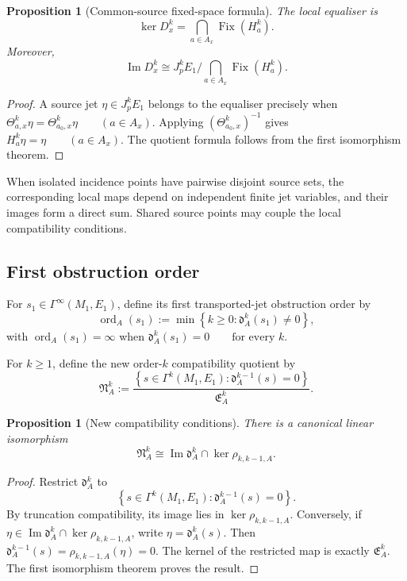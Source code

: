 \documentclass[11pt]{article}
\theoremstyle{plain}
\newtheorem{proposition}[theorem]{Proposition}
\theoremstyle{definition}
\begin{document}
\begin{proposition}[Common-source fixed-space formula]
\label{prop:common-source-fixed-space}
The local equaliser is
\[
  \ker D_x^k
  =
  \bigcap_{a\in A_x}
  \operatorname{Fix}(H_a^k).
\]
Moreover,
\[
  \operatorname{Im}D_x^k
  \cong
  J_p^kE_1
  \bigg/
  \bigcap_{a\in A_x}
  \operatorname{Fix}(H_a^k).
\]
\end{proposition}

\begin{proof}
A source jet \(\eta\in J_p^kE_1\) belongs to the equaliser precisely
when
\(\Theta_{a,x}^k\eta = \Theta_{a_0,x}^k\eta \qquad (a\in A_x)\).
Applying \(\left( \Theta_{a_0,x}^k \right)^{-1}\) gives
\(H_a^k\eta=\eta \qquad (a\in A_x)\).
The quotient formula follows from the first isomorphism theorem.
\end{proof}

When isolated incidence points have pairwise disjoint source sets, the
corresponding local maps depend on independent finite jet variables,
and their images form a direct sum. Shared source points may couple the
local compatibility conditions.

\subsection{First obstruction order}
\label{subsec:first-obstruction-order}

For
\(s_1\in\Gamma^\infty(M_1,E_1)\),
define its first transported-jet obstruction order by
\[
  \operatorname{ord}_A(s_1)
  :=
  \min
  \left\{
    k\geq0:
    \mathfrak d_A^k(s_1)\neq0
  \right\},
\]
with \(\operatorname{ord}_A(s_1)=\infty\) when
\(\mathfrak d_A^k(s_1)=0 \qquad \text{for every }k\).

For \(k\geq1\), define the new order-\(k\) compatibility quotient by
\[
  \mathfrak N_A^k
  :=
  \frac{
    \left\{
      s\in\Gamma^k(M_1,E_1):
      \mathfrak d_A^{k-1}(s)=0
    \right\}
  }{
    \mathfrak E_A^k
  }.
\]

\begin{proposition}[New compatibility conditions]
\label{prop:new-order-defect}
There is a canonical linear isomorphism
\[
  \mathfrak N_A^k
  \cong
  \operatorname{Im}\mathfrak d_A^k
  \cap
  \ker\rho_{k,k-1,A}.
\]
\end{proposition}

\begin{proof}
Restrict \(\mathfrak d_A^k\) to
\[
  \left\{
    s\in\Gamma^k(M_1,E_1):
    \mathfrak d_A^{k-1}(s)=0
  \right\}.
\]
By truncation compatibility, its image lies in
\(\ker\rho_{k,k-1,A}\).
Conversely, if
\(\eta\in \operatorname{Im}\mathfrak d_A^k \cap \ker\rho_{k,k-1,A}\),
write
\(\eta=\mathfrak d_A^k(s)\).
Then
\(\mathfrak d_A^{k-1}(s) = \rho_{k,k-1,A}(\eta) = 0\).
The kernel of the restricted map is exactly
\(\mathfrak E_A^k\).
The first isomorphism theorem proves the result.
\end{proof}
\end{document}
